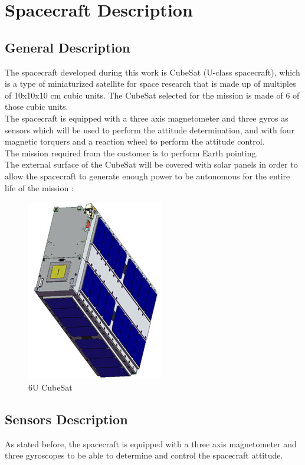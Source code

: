 \documentclass[11pt,a4paper]{report}
\begin{document}
\chapter{Spacecraft Description}

\section{General Description} \label{sec:general}
The spacecraft developed during this work is CubeSat (U-class spacecraft), which is a type of miniaturized satellite for space research that is made up of multiples of 10x10x10 cm cubic units. The CubeSat selected for the mission is made of 6 of those cubic units. \\
The spacecraft is equipped with a three axis magnetometer and three gyros as sensors which will be used to perform the attitude determination, and with four magnetic torquers and a reaction wheel to perform the attitude control.\\
The mission required from the customer is to perform Earth pointing.\\
The external surface of the CubeSat will be covered with solar panels in order to allow the spacecraft to generate enough power to be autonomous for the entire life of the mission : 

\begin{figure}[H]
 	\centering
 	\includegraphics[scale=0.4]{gfx/cubesat_panels.jpg}
    \caption{6U CubeSat}
\end{figure}

\section{Sensors Description}
As stated before, the spacecraft is equipped with a three axis magnetometer and three gyroscopes to be able to determine and control the spacecraft attitude.
\end{document}
